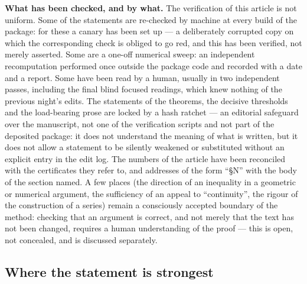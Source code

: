 \textbf{What has been checked, and by what.} The verification of this article is
not uniform. Some of the statements are re-checked by machine at every build
of the package: for these a canary has been set up --- a deliberately corrupted
copy on which the corresponding check is obliged to go red, and this has been
verified, not merely asserted. Some are a one-off numerical sweep: an
independent recomputation performed once outside the package code and recorded
with a date and a report. Some have been read by a human, usually in two
independent passes, including the final blind focused readings, which knew
nothing of the previous night's edits. The statements of the theorems, the
decisive thresholds and the load-bearing prose are locked by a hash ratchet ---
an editorial safeguard over the manuscript, not one of the verification scripts
and not part of the deposited package:
it does not understand the meaning of what is written, but it does not allow a
statement to be silently weakened or substituted without an explicit entry in
the edit log. The numbers of the article have been reconciled with the
certificates they refer to, and addresses of the form ``\S N'' with the body of
the section named. A few places (the direction of an inequality in a geometric
or numerical argument, the sufficiency of an appeal to ``continuity'', the
rigour of the construction of a series) remain a consciously accepted boundary
of the method: checking that an argument is correct, and not merely that the
text has not been changed, requires a human understanding of the proof --- this
is open, not concealed, and is discussed separately.


\subsection{Where the statement is strongest}
\label{sec:10.12}

